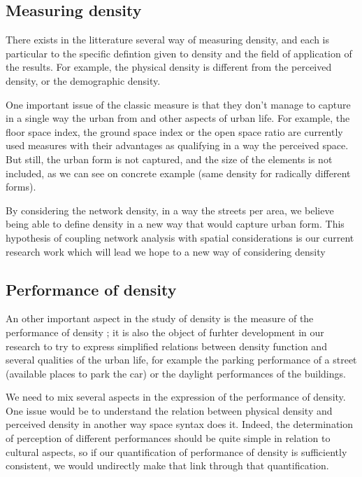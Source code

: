 \documentclass[english]{article}
\begin{document}
\subsection*{Measuring density}

There exists in the litterature several way of measuring density,
and each is particular to the specific defintion given to density
and the field of application of the results. For example, the physical
density is different from the perceived density, or the demographic
density.

\bigskip{}


One important issue of the classic measure is that they don't manage
to capture in a single way the urban from and other aspects of urban
life. For example, the floor space index, the ground space index or
the open space ratio are currently used measures with their advantages
as qualifying in a way the perceived space. But still, the urban form
is not captured, and the size of the elements is not included, as
we can see on concrete example (same density for radically different
forms).

\bigskip{}


By considering the network density, in a way the streets per area,
we believe being able to define density in a new way that would capture
urban form. This hypothesis of coupling network analysis with spatial
considerations is our current research work which will lead we hope
to a new way of considering density


\subsection*{Performance of density}

An other important aspect in the study of density is the measure of
the performance of density ; it is also the object of furhter development
in our research to try to express simplified relations between density
function and several qualities of the urban life, for example the
parking performance of a street (available places to park the car)
or the daylight performances of the buildings.

\bigskip{}


We need to mix several aspects in the expression of the performance
of density. One issue would be to understand the relation between
physical density and perceived density in another way space syntax
does it. Indeed, the determination of perception of different performances
should be quite simple in relation to cultural aspects, so if our
quantification of performance of density is sufficiently consistent,
we would undirectly make that link through that quantification.\bigskip{}
\bigskip{}
\bigskip{}
\end{document}
